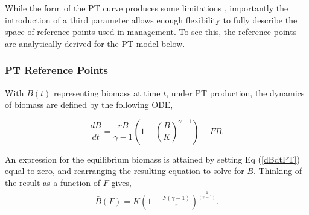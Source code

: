 \documentclass[12pt]{article}
\begin{document}



%
While the form of the PT curve produces some limitations , %
importantly the %
introduction of a third parameter allows enough flexibility to fully describe 
the space of reference points used in management. To see this, the reference 
points are analytically derived for the PT model below. %


%
\subsubsection{PT Reference Points}\label{ptRef}
%
With $B(t)$ representing biomass at time $t$, under PT production, the 
dynamics of biomass are defined by the following ODE,
 
\begin{equation}
\frac{dB}{dt} = \frac{r B}{\gamma-1} \left(1-\left(\frac{B}{K}\right)^{\gamma-1}\right) - FB. \label{dBdtPT}
\end{equation}

An expression for the equilibrium biomass is attained by setting Eq (\ref{dBdtPT}) 
equal to zero, and rearranging the resulting equation to solve for $B$. 
Thinking of the result as a function of $F$ gives, 
\begin{align}
\bar B(F) = K\left(1-\frac{F(\gamma-1)}{r}\right)^{\frac{1}{(\gamma-1)}}. \label{BbarPT}
\end{align}
\end{document}
